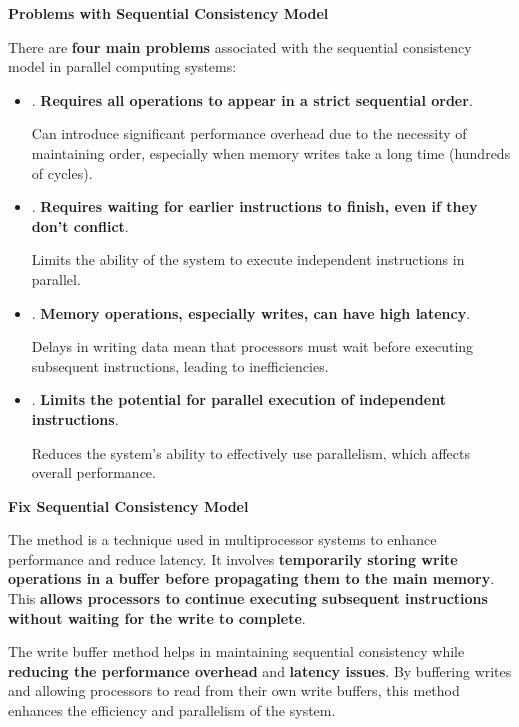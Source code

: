 \highspace
\begin{flushleft}
    \textcolor{Red2}{ \textbf{Problems with Sequential Consistency Model}}
\end{flushleft}
There are \textbf{four main problems} associated with the sequential consistency model in parallel computing systems:
\begin{itemize}
    \item {}. \textbf{Requires all operations to appear in a strict sequential order}.

    Can introduce significant performance overhead due to the necessity of maintaining order, especially when memory writes take a long time (hundreds of cycles).


    \item {}. \textbf{Requires waiting for earlier instructions to finish, even if they don't conflict}.
    
    Limits the ability of the system to execute independent instructions in parallel.


    \item {}. \textbf{Memory operations, especially writes, can have high latency}.
    
    Delays in writing data mean that processors must wait before executing subsequent instructions, leading to inefficiencies.


    \item {}. \textbf{Limits the potential for parallel execution of independent instructions}.
    
    Reduces the system's ability to effectively use parallelism, which affects overall performance.
\end{itemize}

\newpage

\begin{flushleft}
    \textcolor{Green3}{ \textbf{Fix Sequential Consistency Model}}
\end{flushleft}
The  method is a technique used in multiprocessor systems to enhance performance and reduce latency. It involves \textbf{temporarily storing write operations in a buffer before propagating them to the main memory}. This \textbf{allows processors to continue executing subsequent instructions without waiting for the write to complete}.

\highspace
The write buffer method helps in maintaining sequential consistency while \textbf{reducing the performance overhead} and \textbf{latency issues}. By buffering writes and allowing processors to read from their own write buffers, this method enhances the efficiency and parallelism of the system.

